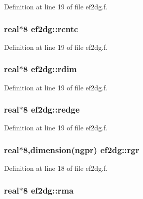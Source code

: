 Definition at line 19 of file ef2dg.f.\hypertarget{namespaceef2dg_5bd161d0c4b9da7f1d03adaa1d39ad06}{
\subsubsection[rcntc]{\setlength{\rightskip}{0pt plus 5cm}real$\ast$8 {\bf ef2dg::rcntc}}}
\label{namespaceef2dg_5bd161d0c4b9da7f1d03adaa1d39ad06}




Definition at line 19 of file ef2dg.f.\hypertarget{namespaceef2dg_cd4de75f2280fe818a45a15f136abde5}{
\subsubsection[rdim]{\setlength{\rightskip}{0pt plus 5cm}real$\ast$8 {\bf ef2dg::rdim}}}
\label{namespaceef2dg_cd4de75f2280fe818a45a15f136abde5}




Definition at line 19 of file ef2dg.f.\hypertarget{namespaceef2dg_40641084d368b57d08ee7f6ac8ffcd4a}{
\subsubsection[redge]{\setlength{\rightskip}{0pt plus 5cm}real$\ast$8 {\bf ef2dg::redge}}}
\label{namespaceef2dg_40641084d368b57d08ee7f6ac8ffcd4a}




Definition at line 19 of file ef2dg.f.\hypertarget{namespaceef2dg_45656eca6a7e6c845eddb72e77912e0a}{
\subsubsection[rgr]{\setlength{\rightskip}{0pt plus 5cm}real$\ast$8,dimension(ngpr) {\bf ef2dg::rgr}}}
\label{namespaceef2dg_45656eca6a7e6c845eddb72e77912e0a}




Definition at line 18 of file ef2dg.f.\hypertarget{namespaceef2dg_c32e940221a1012d9bd4361686553399}{
\subsubsection[rma]{\setlength{\rightskip}{0pt plus 5cm}real$\ast$8 {\bf ef2dg::rma}}}
\label{namespaceef2dg_c32e940221a1012d9bd4361686553399}




